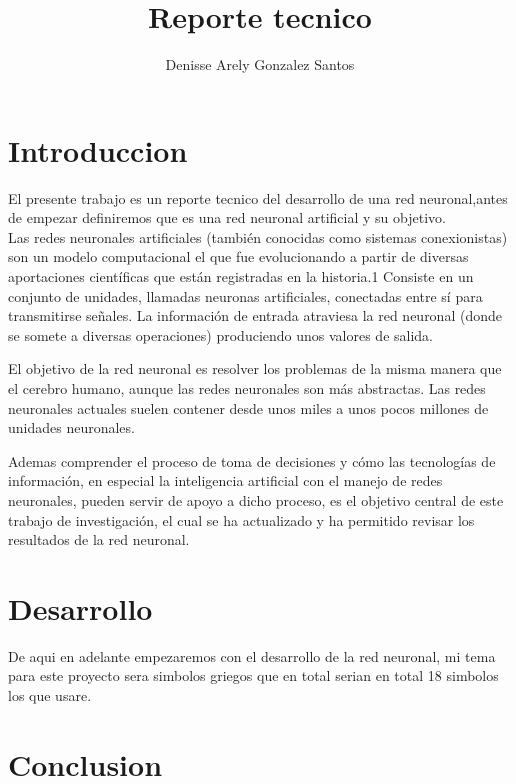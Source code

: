 \documentclass[10pt]{article}         %
\title{Reporte tecnico}
\author{Denisse Arely Gonzalez Santos}
\begin{document}
\maketitle


\section{Introduccion}

El presente trabajo es un reporte tecnico del desarrollo de una red neuronal,antes de empezar definiremos que es una red neuronal artificial y su objetivo.
\\Las redes neuronales artificiales (también conocidas como sistemas conexionistas) son un modelo computacional el que fue evolucionando a partir de diversas aportaciones científicas que están registradas en la historia.1 Consiste en un conjunto de unidades, llamadas neuronas artificiales, conectadas entre sí para transmitirse señales. La información de entrada atraviesa la red neuronal (donde se somete a diversas operaciones) produciendo unos valores de salida.

El objetivo de la red neuronal es resolver los problemas de la misma manera que el cerebro humano, aunque las redes neuronales son más abstractas. Las redes neuronales actuales suelen contener desde unos miles a unos pocos millones de unidades neuronales.

Ademas comprender el proceso de toma de decisiones y cómo las tecnologías de información, en
especial la inteligencia artificial con el manejo de redes neuronales, pueden servir de apoyo
a dicho proceso, es el objetivo central de este trabajo de investigación, el cual se ha
actualizado y ha permitido revisar los resultados de la red neuronal.

\section{Desarrollo}

De aqui en adelante empezaremos con el desarrollo de la red neuronal, mi tema para este proyecto sera simbolos griegos que en total serian en total 18 simbolos los que usare.
\section{Conclusion}
\end{document}
